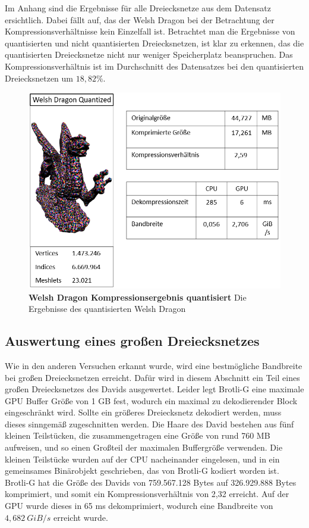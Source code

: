 Im Anhang sind die Ergebnisse für alle Dreiecksnetze aus dem Datensatz ersichtlich.
Dabei fällt auf, das der Welsh Dragon bei der Betrachtung der Kompressionsverhältnisse kein Einzelfall ist.
Betrachtet man die Ergebnisse von quantisierten und nicht quantisierten Dreiecksnetzen, ist klar zu erkennen, das die quantisierten Dreiecksnetze nicht nur weniger Speicherplatz beanspruchen.
Das Kompressionsverhältnis ist im Durchschnitt des Datensatzes bei den quantisierten Dreiecksnetzen um $\mathit{18,82\%}$.

\begin{figure}[htb]
  \centering  
  \includegraphics[scale=0.75]{Bilder/ergebnisse/welshdragon_q.png}
  \caption[Welsh Dragon Kompressionsergebnis quantisiert]{\textbf{Welsh Dragon Kompressionsergebnis quantisiert} Die Ergebnisse des quantisierten Welsh Dragon }
  \label{fig:quantized_welsh_dragon}
\end{figure}

\subsection{Auswertung eines großen Dreiecksnetzes}
\label{subsec:auswertung3}
Wie in den anderen Versuchen erkannt wurde, wird eine bestmögliche Bandbreite bei großen Dreiecksnetzen erreicht.
Dafür wird in diesem Abschnitt ein Teil eines großen Dreiecksnetzes des Davids ausgewertet.
Leider legt Brotli-G eine maximale GPU Buffer Größe von 1 GB fest, wodurch ein maximal zu dekodierender Block eingeschränkt wird.
Sollte ein größeres Dreiecksnetz dekodiert werden, muss dieses sinngemäß zugeschnitten werden.
Die Haare des David bestehen aus fünf kleinen Teilstücken, die zusammengetragen eine Größe von rund 760 MB aufweisen, und so einen Großteil der maximalen Buffergröße verwenden.
Die kleinen Teilstücke wurden auf der CPU nacheinander eingelesen, und in ein gemeinsames Binärobjekt geschrieben, das von Brotli-G kodiert worden ist. \newline
Brotli-G hat die Größe des Davids von 759.567.128 Bytes auf 326.929.888 Bytes komprimiert, und somit ein Kompressionsverhältnis von 2,32 erreicht.
Auf der GPU wurde dieses in 65 ms dekomprimiert, wodurch eine Bandbreite von $\mathit{4,682 \ GiB/s}$ erreicht wurde.


